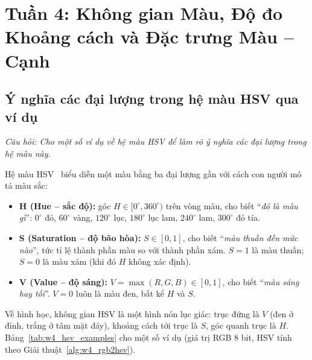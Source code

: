 \section{Tuần 4: Không gian Màu, Độ đo Khoảng cách và Đặc trưng Màu -- Cạnh}
\label{sec:week4}

\subsection{Ý nghĩa các đại lượng trong hệ màu HSV qua ví dụ}
\label{subsec:w4_hsv_examples}

\textit{Câu hỏi: Cho một số ví dụ về hệ màu HSV để làm rõ ý nghĩa các đại lượng trong hệ màu này.}

Hệ màu HSV~\citep{smith1978color} biểu diễn một màu bằng ba đại lượng gần với cách con người mô tả màu sắc:
\begin{itemize}
    \item \textbf{H (Hue -- sắc độ):} góc $H \in [0^\circ, 360^\circ)$ trên vòng màu, cho biết ``\emph{đó là màu gì}'': $0^\circ$ đỏ, $60^\circ$ vàng, $120^\circ$ lục, $180^\circ$ lục lam, $240^\circ$ lam, $300^\circ$ đỏ tía.
    \item \textbf{S (Saturation -- độ bão hòa):} $S \in [0, 1]$, cho biết ``\emph{màu thuần đến mức nào}'', tức tỉ lệ thành phần màu so với thành phần xám. $S = 1$ là màu thuần; $S = 0$ là màu xám (khi đó $H$ không xác định).
    \item \textbf{V (Value -- độ sáng):} $V = \max(R, G, B) \in [0, 1]$, cho biết ``\emph{màu sáng hay tối}''. $V = 0$ luôn là màu đen, bất kể $H$ và $S$.
\end{itemize}

Về hình học, không gian HSV là một hình nón lục giác: trục đứng là $V$ (đen ở đỉnh, trắng ở tâm mặt đáy), khoảng cách tới trục là $S$, góc quanh trục là $H$. Bảng~\ref{tab:w4_hsv_examples} cho một số ví dụ (giá trị RGB 8 bit, HSV tính theo Giải thuật~\ref{alg:w4_rgb2hsv}).

